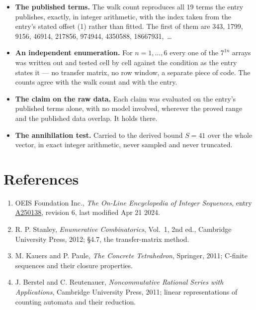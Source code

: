 \documentclass[11pt]{article}
\theoremstyle{definition}
\begin{document}
\begin{itemize}

\item {\bfseries The published terms.} The walk count reproduces all 19 terms the entry publishes, exactly, in integer arithmetic, with the index taken from the entry's stated offset (1) rather than fitted. The first of them are 343, 1799, 9156, 46914, 217856, 974944, 4350588, 18667931,~\dots

\item {\bfseries An independent enumeration.} For $n = 1,\dots,6$ every one of the $7^{1n}$ arrays was written out and tested cell by cell against the condition as the entry states it --- no transfer matrix, no row window, a separate piece of code. The counts agree with the walk count and with the entry.

\item {\bfseries The claim on the raw data.} Each claim was evaluated on the entry's published terms alone, with no model involved, wherever the proved range and the published data overlap. It holds there.

\item {\bfseries The annihilation test.} Carried to the derived bound $S = 41$ over the whole vector, in exact integer arithmetic, never sampled and never truncated.

\end{itemize}

\section{References}

\begin{enumerate}

\item OEIS Foundation Inc., \emph{The On-Line Encyclopedia of Integer Sequences}, entry \href{https://oeis.org/A250138}{A250138}, revision 6, last modified Apr 21 2024.

\item R. P. Stanley, \emph{Enumerative Combinatorics}, Vol.~1, 2nd ed., Cambridge University Press, 2012; \S4.7, the transfer-matrix method.

\item M. Kauers and P. Paule, \emph{The Concrete Tetrahedron}, Springer, 2011; C-finite sequences and their closure properties.

\item J. Berstel and C. Reutenauer, \emph{Noncommutative Rational Series with Applications}, Cambridge University Press, 2011; linear representations of counting automata and their reduction.

\end{enumerate}
\end{document}

